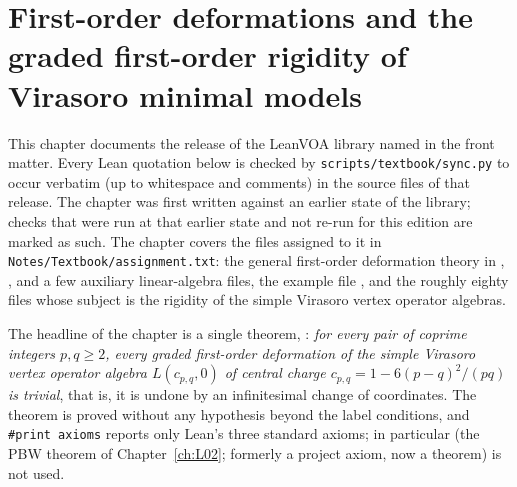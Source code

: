 \chapter{First-order deformations and the graded first-order rigidity of Virasoro minimal models}\label{ch:L07}
\begingroup\setlength{\emergencystretch}{3em}

\providecommand{\lsevenvac}{\mathbf{1}}
\providecommand{\lsevenV}{\mathcal{V}}
\providecommand{\lsevenR}{R}
\providecommand{\lsevenE}{\mathcal{E}}
\providecommand{\lsevenK}{\mathsf{K}}
\providecommand{\lsevenN}{\mathsf{N}}
\providecommand{\lsevenLt}{\widetilde{L}}
\providecommand{\lsevencpq}{c_{p,q}}

This chapter documents the release of the LeanVOA library named in the front matter. Every Lean quotation below is checked by \texttt{scripts/textbook/sync.py}
to occur verbatim (up to whitespace and comments) in the source files of that release. The chapter was
first written against an earlier state of the library; checks that were run at that earlier state and not re-run for this edition are marked as such. The chapter covers the files assigned to it in
\texttt{Notes/Textbook/assignment.txt}: the general first-order deformation theory in
, ,
 and a few auxiliary linear-algebra files,
the example file , and the
roughly eighty files  whose subject is the rigidity of
the simple Virasoro vertex operator algebras.

The headline of the chapter is a single theorem,
: \emph{for every pair of coprime integers
$p,q\ge2$, every graded first-order deformation of the simple Virasoro vertex operator algebra
$L(\lsevencpq,0)$ of central charge $\lsevencpq = 1-6(p-q)^2/(pq)$ is trivial}, that is, it is
undone by an infinitesimal change of coordinates. The theorem is proved without any hypothesis
beyond the label conditions, and \texttt{\#print axioms} reports only Lean's three standard axioms;
in particular  (the PBW theorem of Chapter~\ref{ch:L02}; formerly a project axiom, now a theorem) is not used.

